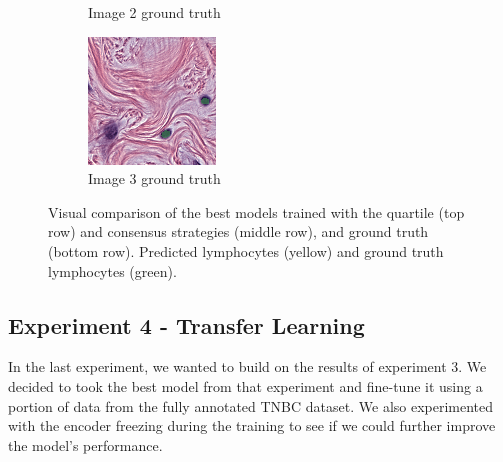 \begin{figure}[H]
\begin{subfigure}[b]{0.32\textwidth}
    \caption{Image 2 ground truth}
  \end{subfigure}\hfill
  \begin{subfigure}[b]{0.32\textwidth}
    \centering
    \includegraphics[width=\linewidth]{assets/images/for_presentation/exp3-3-gt.png}
    \caption{Image 3 ground truth}
  \end{subfigure}
  \caption{Visual comparison of the best models trained with the quartile (top row) and consensus strategies (middle row), and ground truth (bottom row). Predicted lymphocytes (yellow) and ground truth lymphocytes (green).}
  \label{fig:exp3-results}
\end{figure}


\subsection{Experiment 4 - Transfer Learning}
In the last experiment, we wanted to build on the results of experiment 3. We decided to took the best model from that experiment and fine-tune it using a portion of data from the fully annotated TNBC dataset. We also experimented with the encoder freezing during the training to see if we could further improve the model's performance. 

